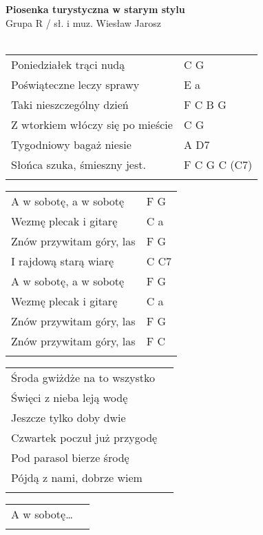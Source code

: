 \documentclass[a5paper]{article}
\begin{document}


\noindent
\fontsize{12pt}{15pt}\selectfont
\textbf{Piosenka turystyczna w starym stylu} \\
\fontsize{8pt}{10pt}\selectfont
Grupa R / sł. i muz. Wiesław Jarosz \\ \\
\fontsize{10pt}{12pt}\selectfont
{}
\begin{tabular}{@{}p{7.50cm}p{3cm}@{}}
\noindent
Poniedziałek trąci nudą & C G \\
Poświąteczne leczy sprawy & E a \\
Taki nieszczególny dzień & F C B G \\
Z wtorkiem włóczy się po mieście & C G \\
Tygodniowy bagaż niesie & A D7 \\
Słońca szuka, śmieszny jest. & F C G C (C7) \\ \\
\end{tabular}

\noindent
\begin{tabular}{@{}p{6.50cm}p{3cm}@{}} 
A w sobotę, a w sobotę & F G \\
Wezmę plecak i gitarę & C a \\
Znów przywitam góry, las & F G \\
I rajdową starą wiarę & C C7 \\
A w sobotę, a w sobotę & F G \\
Wezmę plecak i gitarę & C a \\
Znów przywitam góry, las & F G \\
Znów przywitam góry, las & F C \\ \\
\end{tabular}

\noindent
\begin{tabular}{@{}p{7.50cm}p{3cm}@{}}
Środa gwiżdże na to wszystko \\
Święci z nieba leją wodę \\
Jeszcze tylko doby dwie \\
Czwartek poczuł już przygodę \\
Pod parasol bierze środę \\
Pójdą z nami, dobrze wiem \\ \\
\end{tabular}

\noindent
\begin{tabular}{@{}p{7.50cm}p{3cm}@{}}
A w sobotę… \\ \\
\end{tabular}
\end{document}
